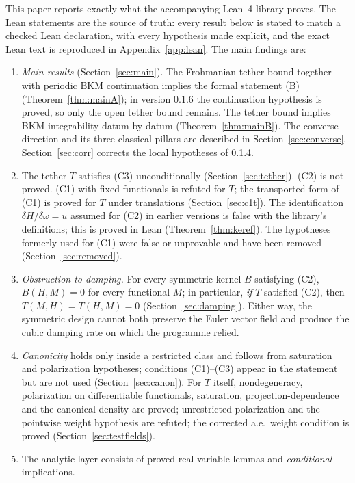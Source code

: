 \documentclass[11pt,a4paper]{article}
\theoremstyle{plain}
\theoremstyle{definition}
\theoremstyle{remark}
\begin{document}
This paper reports exactly what the accompanying Lean~4 library proves. The Lean statements are the
source of truth: every result below is stated to match a checked Lean declaration, with every hypothesis
made explicit, and the exact Lean text is reproduced in Appendix~\ref{app:lean}. The main findings are:
\begin{enumerate}[label=(\roman*)]
\item \emph{Main results} (Section~\ref{sec:main}). The Frohmanian tether bound together with periodic BKM
continuation implies the formal statement (B) (Theorem~\ref{thm:mainA}); in version 0.1.6 the continuation
hypothesis is proved, so only the open tether bound remains. The tether bound implies BKM
integrability datum by datum (Theorem~\ref{thm:mainB}). The converse direction and its three classical pillars are
described in Section~\ref{sec:converse}. Section~\ref{sec:corr} corrects the local hypotheses of 0.1.4.
\item The tether $T$ satisfies (C3) unconditionally (Section~\ref{sec:tether}). (C2) is not proved. (C1)
with fixed functionals is refuted for $T$; the transported form of (C1) is proved for $T$ under translations
(Section~\ref{sec:c1t}). The identification $\delta H/\delta\omega=u$ assumed for (C2) in earlier versions is false with the
library's definitions; this is proved in Lean (Theorem~\ref{thm:keref}). The hypotheses formerly used for
(C1) were false or unprovable and have been removed (Section~\ref{sec:removed}).
\item \emph{Obstruction to damping.} For every symmetric kernel $B$ satisfying (C2), $B(H,M)=0$ for every
functional $M$; in particular, \emph{if} $T$ satisfied (C2), then $T(M,H)=T(H,M)=0$
(Section~\ref{sec:damping}). Either way, the symmetric design cannot both preserve the Euler vector field
and produce the cubic damping rate on which the programme relied.
\item \emph{Canonicity} holds only inside a restricted class and follows from saturation and polarization
hypotheses; conditions (C1)--(C3) appear in the statement but are not used (Section~\ref{sec:canon}). For $T$
itself, nondegeneracy, polarization on differentiable functionals, saturation, projection-dependence and the
canonical density are proved; unrestricted polarization and the pointwise weight hypothesis are refuted; the
corrected a.e.\ weight condition is proved (Section~\ref{sec:testfields}).
\item The analytic layer consists of proved real-variable lemmas and \emph{conditional} implications.

\end{enumerate}
\end{document}
